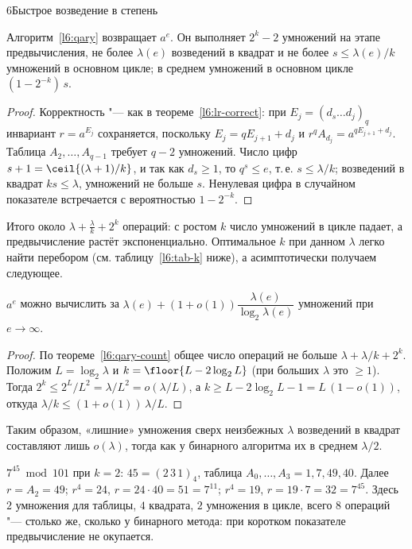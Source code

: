 \begin{lecture}{6}{Быстрое возведение в степень}
\begin{theorem}\label{l6:qary-count}
Алгоритм~\ref{l6:qary} возвращает $a^e$. Он выполняет $2^k - 2$ умножений на этапе
предвычисления, не более $\lambda(e)$ возведений в квадрат и не более
$s \le \lambda(e)/k$ умножений в основном цикле; в среднем умножений в основном
цикле $(1 - 2^{-k})\,s$.
\end{theorem}

\begin{proof}
Корректность "--- как в теореме~\ref{l6:lr-correct}: при $E_j = (d_s \dots d_j)_q$ инвариант
$r = a^{E_j}$ сохраняется, поскольку $E_j = q E_{j+1} + d_j$ и
$r^{q} A_{d_j} = a^{q E_{j+1} + d_j}$. Таблица $A_2, \dots, A_{q-1}$ требует $q - 2$ умножений.
Число цифр $s + 1 = \ceil{(\lambda + 1)/k}$, и так как $d_s \ge 1$, то
$q^s \le e$, т.\,е. $s \le \lambda/k$; возведений в квадрат $ks \le \lambda$, умножений не
больше $s$. Ненулевая цифра в случайном показателе встречается с вероятностью $1 - 2^{-k}$.
\end{proof}

Итого около $\lambda + \frac{\lambda}{k} + 2^k$ операций: с ростом $k$ число умножений в цикле
падает, а предвычисление растёт экспоненциально. Оптимальное $k$ при данном $\lambda$ легко найти
перебором (см. таблицу~\ref{l6:tab-k} ниже), а асимптотически получаем следующее.

\begin{theorem}[Брауэр, 1939]\label{l6:brauer}
$a^e$ можно вычислить за $\lambda(e) + (1 + o(1))\dfrac{\lambda(e)}{\log_2 \lambda(e)}$ умножений
при $e \to \infty$.
\end{theorem}

\begin{proof}
По теореме~\ref{l6:qary-count} общее число операций не больше
$\lambda + \lambda/k + 2^k$. Положим $L = \log_2 \lambda$ и $k = \floor{L - 2\log_2 L}$
(при больших $\lambda$ это $\ge 1$). Тогда $2^k \le 2^{L}/L^2 = \lambda / L^2 = o(\lambda / L)$,
а $k \ge L - 2\log_2 L - 1 = L\,(1 - o(1))$, откуда $\lambda/k \le (1 + o(1))\,\lambda/L$.
\end{proof}

Таким образом, «лишние» умножения сверх неизбежных $\lambda$ возведений в квадрат составляют
лишь $o(\lambda)$, тогда как у бинарного алгоритма их в среднем $\lambda/2$.

\begin{example}
$7^{45} \bmod 101$ при $k = 2$: $45 = (2\,3\,1)_4$, таблица $A_0, \dots, A_3 = 1, 7, 49, 40$.
Далее $r = A_2 = 49$; $r^4 = 24$, $r = 24 \cdot 40 = 51 = 7^{11}$; $r^4 = 19$,
$r = 19 \cdot 7 = 32 = 7^{45}$. Здесь $2$ умножения для таблицы, $4$ квадрата, $2$ умножения
в цикле, всего $8$ операций "--- столько же, сколько у бинарного метода: при коротком показателе
предвычисление не окупается.
\end{example}


\end{lecture}
